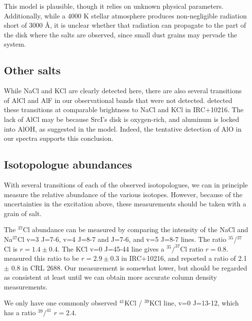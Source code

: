 \documentclass[twocolumn]{aastex62}
\newcommand{\sourcei}{SrcI\xspace}
\newcommand{\rlp}[1]{\textcolor{red!65!black}{\textbf{[RLP: #1]}}}
\newcommand{\ag}[1]{\textcolor{red!65!black}{\textbf{[AG: #1]}}}
\begin{document}
This model is plausible, though it relies on unknown physical parameters.
Additionally, while a 4000 K stellar atmosphere \citep{Testi2010a} produces
non-negligible radiation short of 3000 \AA, it is unclear whether that
radiation can propagate to the part of the disk where the salts are observed,
since small dust grains may pervade the system.


\subsection{Other salts}
While NaCl and KCl are clearly detected here, there are also several
transitions of AlCl and AlF in our observational bands that were not detected.
\citet{Cernicharo1987a} detected these transitions at comparable brightness to
NaCl and KCl in IRC+10216.  The lack of AlCl may be because \sourcei's disk is
oxygen-rich, and aluminum is locked into AlOH, as suggested in the
\citet{Cherchneff2012a} model.  Indeed, the tentative detection of AlO
in our spectra supports this conclusion.



\subsection{Isotopologue abundances}
With several transitions of each of the observed isotopologues, we can in
principle measure the relative abundance of the various isotopes.  However,
because of the uncertainties in the excitation above, these measurements should
be taken with a grain of salt.

The $^{37}$Cl abundance can be measured by comparing the intensity of the NaCl
and Na$^{37}$Cl v=3 J=7-6, v=4 J=8-7 and J=7-6, and v=5 J=8-7 lines.  The ratio
$^{35}$/$^{37}$Cl is $r=1.4\pm0.4$.  The KCl v=0 J=45-44 line gives a
$^{35}/^{37}$Cl ratio $r=0.8$.  \citet{Agundez2012a} measured this ratio to be
$r=2.9\pm0.3$ in IRC+10216, and \citet{Highberger2003a} reported a ratio of 2.1
$\pm$ 0.8 in CRL 2688.  Our measurement is somewhat lower, but should be
regarded as consistent at least until we can obtain more accurate column
density measurements. 


We only have one commonly observed $^{41}$KCl / $^{39}$KCl line, v=0 J=13-12,
which has a ratio $^{39}/^{41}$ $r=2.4$. 
\end{document}
